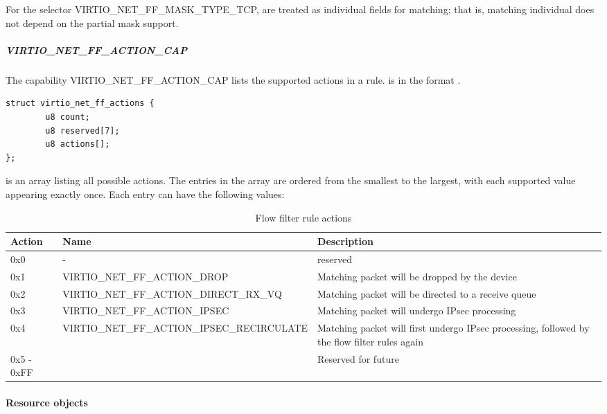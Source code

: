 For the selector  VIRTIO_NET_FF_MASK_TYPE_TCP, 
are treated as individual fields for matching; that is, matching individual
 does not depend on the partial mask support.

\subparagraph{VIRTIO_NET_FF_ACTION_CAP}
\label{par:Device Types / Network Device / Device Operation / Flow filter / Device and driver capabilities / VIRTIO-NET-FF-ACTION-CAP}

The capability VIRTIO_NET_FF_ACTION_CAP lists the supported actions in a rule.
 is in the format .

\begin{lstlisting}
struct virtio_net_ff_actions {
        u8 count;
        u8 reserved[7];
        u8 actions[];
};
\end{lstlisting}

 is an array listing all possible actions.
The entries in the array are ordered from the smallest to the largest,
with each supported value appearing exactly once. Each entry can have the
following values:

\begin{table}[H]
\caption{Flow filter rule actions}
\label{table:Device Types / Network Device / Device Operation / Flow filter / Device and driver capabilities / VIRTIO-NET-FF-ACTION-CAP / flow filter rule actions}
\begin{tabularx}{\textwidth}{ |l|X|X| }
\hline
Action & Name & Description \\
\hline \hline
0x0 & - & reserved \\
\hline
0x1 & VIRTIO_NET_FF_ACTION_DROP & Matching packet will be dropped by the device \\
\hline
0x2 & VIRTIO_NET_FF_ACTION_DIRECT_RX_VQ & Matching packet will be directed to a receive queue \\
\hline
0x3 & VIRTIO_NET_FF_ACTION_IPSEC & Matching packet will undergo IPsec processing \\
\hline
0x4 & VIRTIO_NET_FF_ACTION_IPSEC_RECIRCULATE & Matching packet will first undergo IPsec processing, followed by the flow filter rules again \\
\hline
0x5 - 0xFF & & Reserved for future \\
\hline
\end{tabularx}
\end{table}

\paragraph{Resource objects}
\label{par:Device Types / Network Device / Device Operation / Flow filter / Resource objects}


